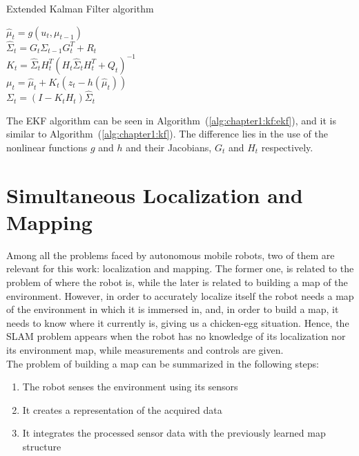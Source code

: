 \begin{algorithm}
    \caption{Extended Kalman Filter algorithm}
    \label{alg:chapter1:kf:ekf}

    \BlankLine
    \BlankLine
    $\hat\mu_t = g \left(u_t, \mu_{t-1}\right)$ \\
    $\hat\Sigma_t = G_t \Sigma_{t-1} G_t^T + R_t$ \\
    \BlankLine
    $K_t = \hat\Sigma_t H_t^T \left(H_t \hat\Sigma_t H_t^T + Q_t\right)^{-1}$ \\
    $\mu_t = \hat\mu_t + K_t \left(z_t - h \left(\hat\mu_t\right) \right) $ \\
    $\Sigma_t = (I - K_t H_t) \hat\Sigma_t$ \\
    \BlankLine
\end{algorithm}

The \ac{EKF} algorithm can be seen in Algorithm~(\ref{alg:chapter1:kf:ekf}), and it is similar to Algorithm~(\ref{alg:chapter1:kf}). The difference lies in the use of the nonlinear functions $g$ and $h$ and their Jacobians, $G_t$ and $H_t$ respectively.

\section{Simultaneous Localization and Mapping}
\label{sec:chapter1:slam}
Among all the problems faced by autonomous mobile robots, two of them are relevant for this work: localization and mapping. The former one, is related to the problem of where the robot is, while the later is related to building a map of the environment. However, in order to accurately localize itself the robot needs a map of the environment in which it is immersed in, and, in order to build a map, it needs to know where it currently is, giving us a chicken-egg situation. Hence, the \ac{SLAM} problem appears when the robot has no knowledge of its localization nor its environment map, while measurements and controls are given.\\

The problem of building a map can be summarized in the following steps:
\begin{enumerate}
    \item{The robot senses the environment using its sensors}
    \item{It creates a representation of the acquired data}
    \item{It integrates the processed sensor data with the previously learned map structure}
\end{enumerate}

